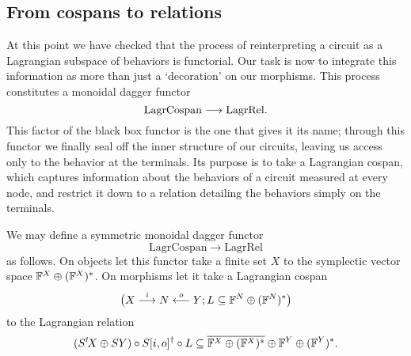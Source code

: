 \subsection{From cospans to relations}

At this point we have checked that the process of reinterpreting a circuit as a
Lagrangian subspace of behaviors is functorial. Our task is now to integrate
this information as more than just a `decoration' on our morphisms. This process
constitutes a monoidal dagger functor
\[
  \mathrm{LagrCospan} \longrightarrow \mathrm{LagrRel}.
\]
This factor of the black box functor is the one that gives it its name;
through this functor we finally seal off the inner structure of our circuits,
leaving us access only to the behavior at the terminals. Its purpose is to take a 
Lagrangian cospan, which captures information about the behaviors of a 
circuit measured at every node, and restrict it down to a 
relation detailing the behaviors simply on the terminals. 

\begin{proposition}
We may define a symmetric monoidal dagger functor
\[
  \mathrm{LagrCospan} \longrightarrow \mathrm{LagrRel}
\]
as follows. On objects let this functor take a finite set $X$ to the symplectic
vector space ${\mathbb F}^X \oplus ({\mathbb F}^X)^\ast$. On morphisms let it take a Lagrangian
cospan
\[
  \big(X\stackrel{i}{\longrightarrow} N \stackrel{o}{\longleftarrow} Y; L
  \subseteq {\mathbb F}^N \oplus ({\mathbb F}^N)^\ast\big)
\]
to the Lagrangian relation
\[
  (S^t\!X\oplus SY) \circ S[i,o]^\dagger \circ L \subseteq
  \overline{{\mathbb F}^X \oplus ({\mathbb F}^X)^\ast} \oplus {\mathbb F}^Y \oplus ({\mathbb F}^Y)^\ast.  
\]  
\end{proposition}

